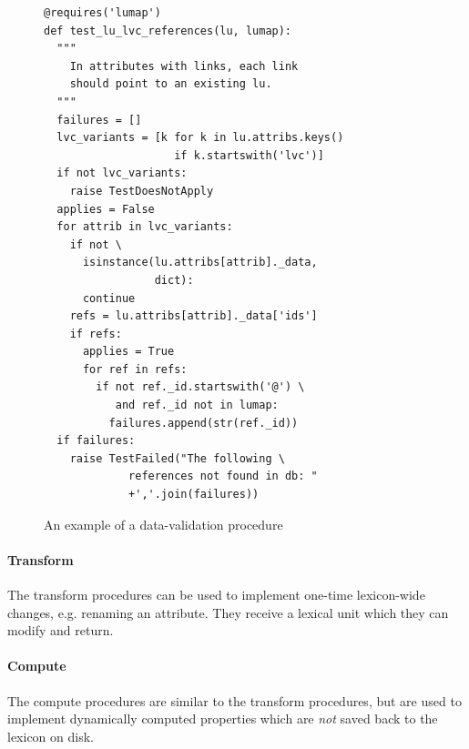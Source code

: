 \documentclass[10pt, a4paper]{article}
\newcommand{\rrr}[1]{{\color{red} REVIEWER: #1}}
\begin{document}
\begin{figure}
\small
% 
% 
% 
\begin{verbatim}
@requires('lumap')
def test_lu_lvc_references(lu, lumap):
  """
    In attributes with links, each link
    should point to an existing lu.
  """
  failures = []
  lvc_variants = [k for k in lu.attribs.keys()
                    if k.startswith('lvc')]
  if not lvc_variants:
    raise TestDoesNotApply
  applies = False
  for attrib in lvc_variants:
    if not \
      isinstance(lu.attribs[attrib]._data,
                 dict):
      continue
    refs = lu.attribs[attrib]._data['ids']
    if refs:
      applies = True
      for ref in refs:
        if not ref._id.startswith('@') \
           and ref._id not in lumap:
          failures.append(str(ref._id))
  if failures:
    raise TestFailed("The following \
             references not found in db: "
             +','.join(failures))
\end{verbatim}

\caption{\label{fig:data-test-code}An example of a data-validation procedure}
\end{figure}

\paragraph{Transform} The transform procedures can be used to implement one-time lexicon-wide changes, e.g.
renaming an attribute. They receive a lexical unit which they can modify and return.

\paragraph{Compute}\label{sec:computed} The compute procedures are similar to the transform procedures, but are used to implement dynamically computed properties which are \emph{not} saved back to the lexicon on disk.
\end{document}
